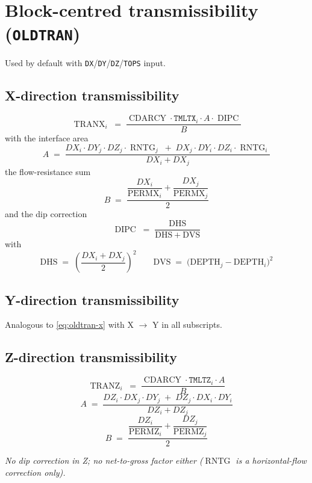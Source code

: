\documentclass[11pt,a4paper]{article}
\newcommand{\kw}[1]{\texttt{#1}}
\newcommand{\note}[1]{\par\smallskip\textit{#1}\par\smallskip}
\DeclareMathOperator{\CDARCY}{CDARCY}
\DeclareMathOperator{\TRANX}{TRANX}
\DeclareMathOperator{\TRANZ}{TRANZ}
\DeclareMathOperator{\DIPC}{DIPC}
\DeclareMathOperator{\RNTG}{RNTG}
\DeclareMathOperator{\PERMX}{PERMX}
\DeclareMathOperator{\PERMZ}{PERMZ}
\begin{document}
\section{Block-centred transmissibility (\kw{OLDTRAN})}

Used by default with \kw{DX}/\kw{DY}/\kw{DZ}/\kw{TOPS} input.

\subsection*{X-direction transmissibility}
\begin{equation}
\TRANX_i \;=\; \frac{\CDARCY \cdot \kw{TMLTX}_i \cdot A \cdot \DIPC}{B}
\label{eq:oldtran-x}
\tag{TD 2.1}
\end{equation}
with the interface area
\begin{equation}
A \;=\; \frac{DX_i \cdot DY_j \cdot DZ_j \cdot \RNTG_j \;+\; DX_j \cdot DY_i \cdot DZ_i \cdot \RNTG_i}{DX_i + DX_j}
\label{eq:oldtran-A}
\tag{TD 2.2}
\end{equation}
the flow-resistance sum
\begin{equation}
B \;=\; \frac{\dfrac{DX_i}{\PERMX_i} + \dfrac{DX_j}{\PERMX_j}}{2}
\label{eq:oldtran-B}
\tag{TD 2.3}
\end{equation}
and the dip correction
\begin{equation}
\DIPC \;=\; \frac{\mathrm{DHS}}{\mathrm{DHS} + \mathrm{DVS}}
\label{eq:oldtran-dipc}
\tag{TD 2.4}
\end{equation}
with
\[
\mathrm{DHS} \;=\; \left(\frac{DX_i + DX_j}{2}\right)^{2}
\qquad
\mathrm{DVS} \;=\; \bigl(\mathrm{DEPTH}_j - \mathrm{DEPTH}_i\bigr)^{2}
\]

\subsection*{Y-direction transmissibility}
Analogous to \eqref{eq:oldtran-x} with X $\to$ Y in all subscripts.

\subsection*{Z-direction transmissibility}
\begin{equation}
\TRANZ_i \;=\; \frac{\CDARCY \cdot \kw{TMLTZ}_i \cdot A}{B}
\label{eq:oldtran-z}
\tag{TD 2.5}
\end{equation}
\begin{equation}
A \;=\; \frac{DZ_i \cdot DX_j \cdot DY_j \;+\; DZ_j \cdot DX_i \cdot DY_i}{DZ_i + DZ_j}
\label{eq:oldtran-Az}
\tag{TD 2.6}
\end{equation}
\begin{equation}
B \;=\; \frac{\dfrac{DZ_i}{\PERMZ_i} + \dfrac{DZ_j}{\PERMZ_j}}{2}
\label{eq:oldtran-Bz}
\tag{TD 2.7}
\end{equation}
\note{No dip correction in Z; no net-to-gross factor either ($\RNTG$ is a horizontal-flow correction only).}
\end{document}
